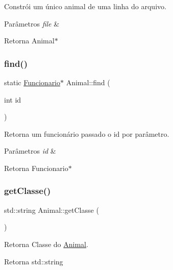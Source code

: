 Constrói um único animal de uma linha do arquivo. 


\begin{DoxyParams}{Parâmetros}
{\em file} & \\
\hline
\end{DoxyParams}
\begin{DoxyReturn}{Retorna}
Animal$\ast$ 
\end{DoxyReturn}
\mbox{\label{classAnimal_afe18aa534325e42d39f3e778bcc89732}} 
\subsubsection{\texorpdfstring{find()}{find()}}
{\footnotesize\ttfamily static \hyperlink{classFuncionario}{Funcionario}$\ast$ Animal\+::find (\begin{DoxyParamCaption}\item[{int}]{id }\end{DoxyParamCaption})\hspace{0.3cm}{\ttfamily [static]}}



Retorna um funcionário passado o id por parâmetro. 


\begin{DoxyParams}{Parâmetros}
{\em id} & \\
\hline
\end{DoxyParams}
\begin{DoxyReturn}{Retorna}
Funcionario$\ast$ 
\end{DoxyReturn}
\mbox{\label{classAnimal_a22e54ff48117237f9a201f5eca0eea81}} 
\subsubsection{\texorpdfstring{get\+Classe()}{getClasse()}}
{\footnotesize\ttfamily std\+::string Animal\+::get\+Classe (\begin{DoxyParamCaption}{ }\end{DoxyParamCaption})}



Retorna Classe do \hyperlink{classAnimal}{Animal}. 

\begin{DoxyReturn}{Retorna}
std\+::string 
\end{DoxyReturn}
\mbox{\label{classAnimal_a6fcb9a0b8debecb58ca20dbf88bce329}} 
